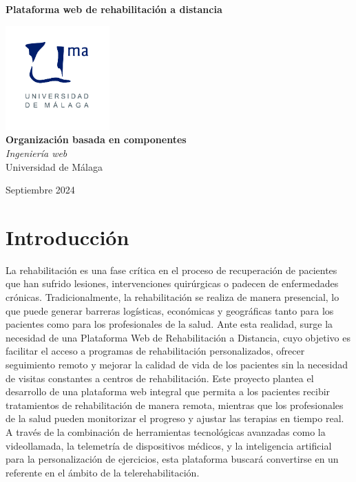 \documentclass{article}
\begin{document}
\begin{titlepage}
	\centering
	\vspace*{3cm}
	
	{\Huge \textbf{Plataforma web de rehabilitación a distancia}\\[0.5cm]}
	
	\vspace{2cm}
	\includegraphics[width=0.3\textwidth]{images/uma_logo.jpg}\\[1cm]
	
	{\LARGE \textbf{Organización basada en componentes}\\[0.5cm]}
	{\large \textit{Ingeniería web}\\
		Universidad de Málaga\\
		}
	
	\vfill
	
	{\large Septiembre 2024}
\end{titlepage}

\tableofcontents

\newpage

\section{Introducción}
La rehabilitación es una fase crítica en el proceso de recuperación de pacientes que han
sufrido lesiones, intervenciones quirúrgicas o padecen de enfermedades crónicas.
Tradicionalmente, la rehabilitación se realiza de manera presencial, lo que puede generar
barreras logísticas, económicas y geográficas tanto para los pacientes como para los
profesionales de la salud. Ante esta realidad, surge la necesidad de una Plataforma Web de
Rehabilitación a Distancia, cuyo objetivo es facilitar el acceso a programas de rehabilitación
personalizados, ofrecer seguimiento remoto y mejorar la calidad de vida de los pacientes sin
la necesidad de visitas constantes a centros de rehabilitación.
Este proyecto plantea el desarrollo de una plataforma web integral que permita a los
pacientes recibir tratamientos de rehabilitación de manera remota, mientras que los
profesionales de la salud pueden monitorizar el progreso y ajustar las terapias en tiempo real.
A través de la combinación de herramientas tecnológicas avanzadas como la videollamada,
la telemetría de dispositivos médicos, y la inteligencia artificial para la personalización de
ejercicios, esta plataforma buscará convertirse en un referente en el ámbito de la telerehabilitación.
\end{document}
